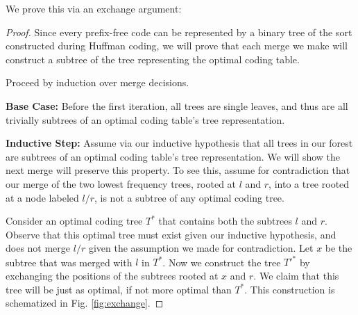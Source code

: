 \documentclass[10pt, twocolumn]{article}
\theoremstyle{prob}
\theoremstyle{definition}
\begin{document}
We prove this via an exchange argument:
\begin{proof}
    Since every prefix-free code can be represented by a binary tree of the sort constructed during Huffman coding, we will prove that each merge we make will construct a subtree of the tree representing the optimal coding table.
    
    Proceed by induction over merge decisions.

    \textbf{Base Case:} Before the first iteration, all trees are single leaves, and thus are all trivially subtrees of an optimal coding table's tree representation.

    \textbf{Inductive Step:} Assume via our inductive hypothesis that all trees in our forest are subtrees of an optimal coding table's tree representation. We will show the next merge will preserve this property. To see this, assume for contradiction that our merge of the two lowest frequency trees, rooted at $l$ and $r$, into a tree rooted at a node labeled $l/r$, is not a subtree of any optimal coding tree. 
    
    Consider an optimal coding tree $T^*$ that contains both the subtrees $l$ and $r$. Observe that this optimal tree must exist given our inductive hypothesis, and does not merge $l/r$ given the assumption we made for contradiction. Let $x$ be the subtree that was merged with $l$ in $T^*$. Now we construct the tree $T'^*$ by exchanging the positions of the subtrees rooted at $x$ and $r$. We claim that this tree will be just as optimal, if not more optimal than $T^*$. This construction is schematized in Fig. \ref{fig:exchange}.


\end{proof}
\end{document}
